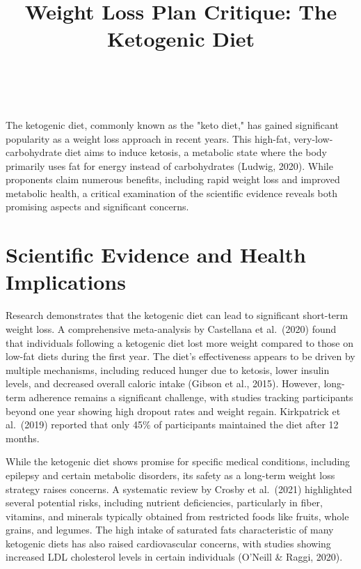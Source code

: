 \documentclass[12pt]{article}
\title{Weight Loss Plan Critique: The Ketogenic Diet}
\author{\fontsize{11}{0}\selectfont{\underline{Name and Student Identification}: Arfaz Hossain, V00984826}\\
        \fontsize{11}{0}\selectfont{\underline{Date of Submission}: November 19, 2024}}
\date{}
\begin{document}
\maketitle
\doublespacing
\vspace{-2em}

The ketogenic diet, commonly known as the "keto diet," has gained significant popularity as a weight loss approach in recent years. This high-fat, very-low-carbohydrate diet aims to induce ketosis, a metabolic state where the body primarily uses fat for energy instead of carbohydrates (Ludwig, 2020). While proponents claim numerous benefits, including rapid weight loss and improved metabolic health, a critical examination of the scientific evidence reveals both promising aspects and significant concerns.\vspace{-2em}

\section*{Scientific Evidence and Health Implications}\vspace{-1em}
Research demonstrates that the ketogenic diet can lead to significant short-term weight loss. A comprehensive meta-analysis by Castellana et al.\ (2020) found that individuals following a ketogenic diet lost more weight compared to those on low-fat diets during the first year. The diet's effectiveness appears to be driven by multiple mechanisms, including reduced hunger due to ketosis, lower insulin levels, and decreased overall caloric intake (Gibson et al., 2015). However, long-term adherence remains a significant challenge, with studies tracking participants beyond one year showing high dropout rates and weight regain. Kirkpatrick et al.\ (2019) reported that only 45\% of participants maintained the diet after 12 months.

While the ketogenic diet shows promise for specific medical conditions, including epilepsy and certain metabolic disorders, its safety as a long-term weight loss strategy raises concerns. A systematic review by Crosby et al.\ (2021) highlighted several potential risks, including nutrient deficiencies, particularly in fiber, vitamins, and minerals typically obtained from restricted foods like fruits, whole grains, and legumes. The high intake of saturated fats characteristic of many ketogenic diets has also raised cardiovascular concerns, with studies showing increased LDL cholesterol levels in certain individuals (O'Neill \& Raggi, 2020).
\end{document}
